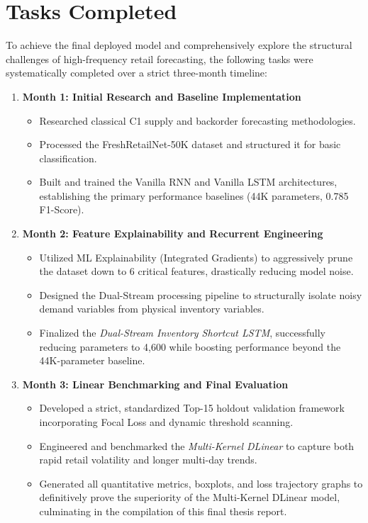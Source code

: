 \chapter{Tasks Completed}
\label{chap:tasks}

To achieve the final deployed model and comprehensively explore the structural challenges of high-frequency retail forecasting, the following tasks were systematically completed over a strict three-month timeline:

\begin{enumerate}
    \item \textbf{Month 1: Initial Research and Baseline Implementation} 
    \begin{itemize}
        \item Researched classical C1 supply and backorder forecasting methodologies.
        \item Processed the FreshRetailNet-50K dataset and structured it for basic classification.
        \item Built and trained the Vanilla RNN and Vanilla LSTM architectures, establishing the primary performance baselines (44K parameters, 0.785 F1-Score).
    \end{itemize}
    
    \item \textbf{Month 2: Feature Explainability and Recurrent Engineering}
    \begin{itemize}
        \item Utilized ML Explainability (Integrated Gradients) to aggressively prune the dataset down to 6 critical features, drastically reducing model noise.
        \item Designed the Dual-Stream processing pipeline to structurally isolate noisy demand variables from physical inventory variables.
        \item Finalized the \textit{Dual-Stream Inventory Shortcut LSTM}, successfully reducing parameters to 4,600 while boosting performance beyond the 44K-parameter baseline.
    \end{itemize}
    
    \item \textbf{Month 3: Linear Benchmarking and Final Evaluation}
    \begin{itemize}
        \item Developed a strict, standardized Top-15 holdout validation framework incorporating Focal Loss and dynamic threshold scanning.
        \item Engineered and benchmarked the \textit{Multi-Kernel DLinear} to capture both rapid retail volatility and longer multi-day trends.
        \item Generated all quantitative metrics, boxplots, and loss trajectory graphs to definitively prove the superiority of the Multi-Kernel DLinear model, culminating in the compilation of this final thesis report.
    \end{itemize}
\end{enumerate}
